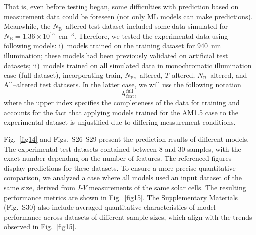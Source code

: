\documentclass[a4paper,fleqn]{cas-sc}
\begin{document}
That is, even before testing began, some difficulties with prediction based on measurement data could be foreseen (not only ML models can make predictions).
Meanwhile, the $N_\mathrm{B}$--altered test dataset included some data simulated for $N_\mathrm{B}=1.36\times10^{15}$~cm$^{-3}$.
Therefore, we tested the experimental data using following models:
i)~models trained on the training dataset for 940~nm illumination; these models had been previously validated on artificial test datasets;
ii)~models trained on all simulated data in monochromatic illumination case (full dataset), incorporating train, $N_\mathrm{Fe}$--altered,
$T$--altered, $N_\mathrm{B}$--altered, and All--altered test datasets.
In the latter case, we will use the following notation
\begin{equation*}
    \mathrm{A}^\mathrm{full}_\mathrm{feat},
\end{equation*}
where the upper index specifies the completeness of the data for training
and accounts for the fact that applying models trained for the AM1.5 case
to the experimental dataset is unjustified due to differing measurement conditions.

Fig.~\ref{fig14} and Figs.~S26--S29 present the prediction results of different models.
The experimental test datasets contained between 8 and 30 samples, with the exact number depending on the number of features.
The referenced figures display predictions for these datasets.
To ensure a more precise quantitative comparison, we analyzed a case where all models used an input dataset of the same size,
derived from $I$-$V$ measurements of the same solar cells.
The resulting performance metrics are shown in Fig.~\ref{fig15}.
The Supplementary Materials (Fig.~S30) also include averaged quantitative characteristics of model performance
across datasets of different sample sizes, which align with the trends observed in Fig.~\ref{fig15}.
\end{document}
